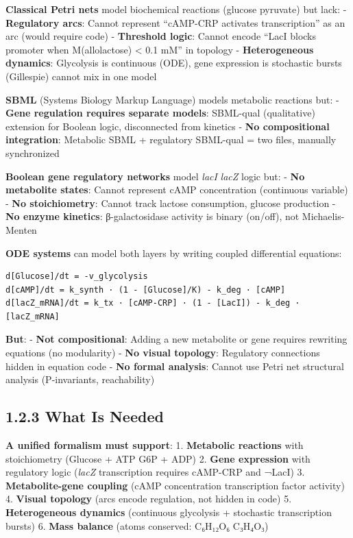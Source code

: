 \textbf{Classical Petri nets} model biochemical reactions (glucose \textrightarrow
pyruvate) but lack: - \textbf{Regulatory arcs}: Cannot represent
``cAMP-CRP activates transcription'' as an arc (would require code) -
\textbf{Threshold logic}: Cannot encode ``LacI blocks promoter when
M(allolactose) \textless{} 0.1 mM'' in topology - \textbf{Heterogeneous
dynamics}: Glycolysis is continuous (ODE), gene expression is stochastic
bursts (Gillespie) \textrightarrow cannot mix in one model

\textbf{SBML} (Systems Biology Markup Language) models metabolic
reactions but: - \textbf{Gene regulation requires separate models}:
SBML-qual (qualitative) extension for Boolean logic, disconnected from
kinetics - \textbf{No compositional integration}: Metabolic SBML +
regulatory SBML-qual = two files, manually synchronized

\textbf{Boolean gene regulatory networks} model \emph{lacI} \textrightarrow
\emph{lacZ} logic but: - \textbf{No metabolite states}: Cannot represent
cAMP concentration (continuous variable) - \textbf{No stoichiometry}:
Cannot track lactose consumption, glucose production - \textbf{No enzyme
kinetics}: β-galactosidase activity is binary (on/off), not
Michaelis-Menten

\textbf{ODE systems} can model both layers by writing coupled
differential equations:

\begin{lstlisting}
d[Glucose]/dt = -v_glycolysis
d[cAMP]/dt = k_synth · (1 - [Glucose]/K) - k_deg · [cAMP]
d[lacZ_mRNA]/dt = k_tx · [cAMP-CRP] · (1 - [LacI]) - k_deg · [lacZ_mRNA]
\end{lstlisting}

\textbf{But}: - \textbf{Not compositional}: Adding a new metabolite or
gene requires rewriting equations (no modularity) - \textbf{No visual
topology}: Regulatory connections hidden in equation code - \textbf{No
formal analysis}: Cannot use Petri net structural analysis
(P-invariants, reachability)

\hypertarget{what-is-needed}{%
\subsection{1.2.3 What Is Needed}\label{what-is-needed}}

\textbf{A unified formalism must support}: 1. \textbf{Metabolic
reactions} with stoichiometry (Glucose + ATP \textrightarrow G6P + ADP) 2.
\textbf{Gene expression} with regulatory logic (\emph{lacZ}
transcription requires cAMP-CRP and ¬LacI) 3. \textbf{Metabolite-gene
coupling} (cAMP concentration \textrightarrow transcription factor activity) 4.
\textbf{Visual topology} (arcs encode regulation, not hidden in code) 5.
\textbf{Heterogeneous dynamics} (continuous glycolysis + stochastic
transcription bursts) 6. \textbf{Mass balance} (atoms conserved: C₆H₁₂O₆
 C₃H₄O₃)


